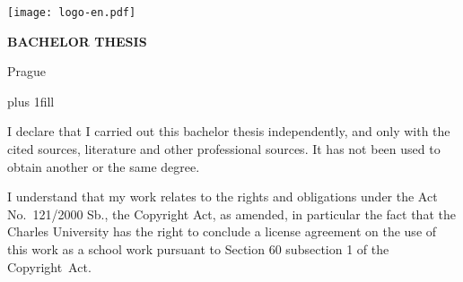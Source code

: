 

\pagestyle{empty}
\hypersetup{pageanchor=false}
\begin{center}
	
	\centerline{\mbox{\texttt{[image: logo-en.pdf]}}}
	
	\vspace{-8mm}
	\vfill
	
	{\bf\Large BACHELOR THESIS}
	
	\vfill
	
	{\LARGE\ThesisAuthor}
	
	\vspace{15mm}
	
	{\LARGE\bfseries\ThesisTitle}
	
	\vfill
	
	\Department
	
	\vfill
	
	{
		\centerline{\vbox{}}}
	
	\vfill
	
	Prague \YearSubmitted
	
\end{center}

\newpage



\openright
\hypersetup{pageanchor=true}
\pagestyle{plain}
\vglue 0pt plus 1fill

\noindent
I declare that I carried out this bachelor thesis independently, and only with the cited
sources, literature and other professional sources. It has not been used to obtain another
or the same degree.

\medskip\noindent
I understand that my work relates to the rights and obligations under the Act No.~121/2000 Sb.,
the Copyright Act, as amended, in particular the fact that the Charles
University has the right to conclude a license agreement on the use of this
work as a school work pursuant to Section 60 subsection 1 of the Copyright~Act.


